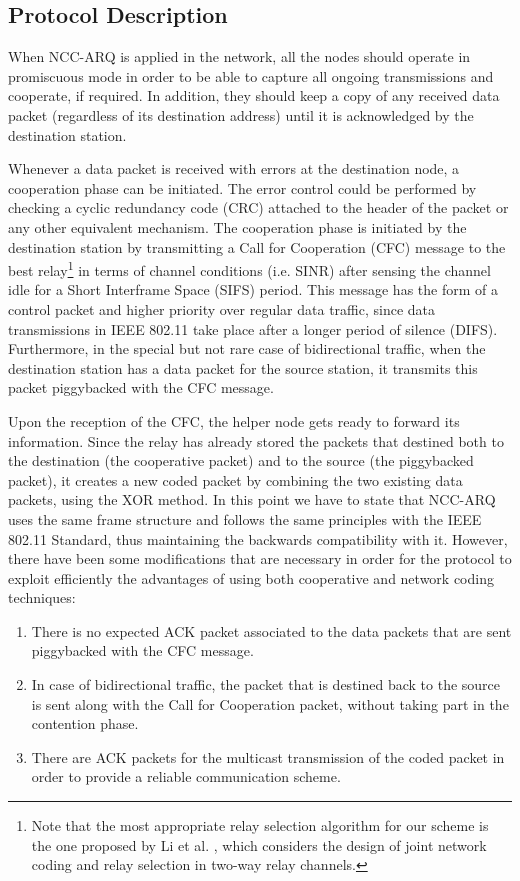 \documentclass[conference]{IEEEtran}
\begin{document}
\subsection{Protocol Description}

When NCC-ARQ is applied in the network, all the nodes should operate in promiscuous mode in order to be able to capture all ongoing transmissions and cooperate, if required. In addition, they should keep a copy of any received data packet (regardless of its destination address) until it is acknowledged by the destination station.

Whenever a data packet is received with errors at the destination node, a cooperation phase can be initiated. The error control could be performed by checking a cyclic redundancy code (CRC) attached to the header of the packet or any other equivalent mechanism. The cooperation phase is initiated by the destination station by transmitting a Call for Cooperation (CFC) message to the best relay\footnote[2]{Note that the most appropriate relay selection algorithm for our scheme is the one proposed by Li et al. \cite{IEEEhowto:selection}, which considers the design of joint network coding and relay selection in two-way relay channels.} in terms of channel conditions (i.e. SINR) after sensing the channel idle for a Short Interframe Space (SIFS) period. This message has the form of a control packet and higher priority over regular data traffic, since data transmissions in IEEE 802.11 take place after a longer period of silence (DIFS). Furthermore, in the special but not rare case of bidirectional traffic, when the destination station has a data packet for the source station, it transmits this packet piggybacked with the CFC message.

Upon the reception of the CFC, the helper node gets ready to forward its information. Since the relay has already stored the packets that destined both to the destination (the cooperative packet) and to the source (the piggybacked packet), it creates a new coded packet by combining the two existing data packets, using the XOR method. In this point we have to state that NCC-ARQ uses the same frame structure and follows the same principles with the IEEE 802.11 Standard, thus maintaining the backwards compatibility with it. However, there have been some modifications that are necessary in order for the protocol to exploit efficiently the advantages of using both cooperative and network coding techniques:
\begin{enumerate}
\item There is no expected ACK packet associated to the data packets that are sent piggybacked with the CFC message.
\item In case of bidirectional traffic, the packet that is destined back to the source is sent along with the Call for Cooperation packet, without taking part in the contention phase.
\item There are ACK packets for the multicast transmission of the coded packet in order to provide a reliable communication scheme.
\end{enumerate}
\end{document}
